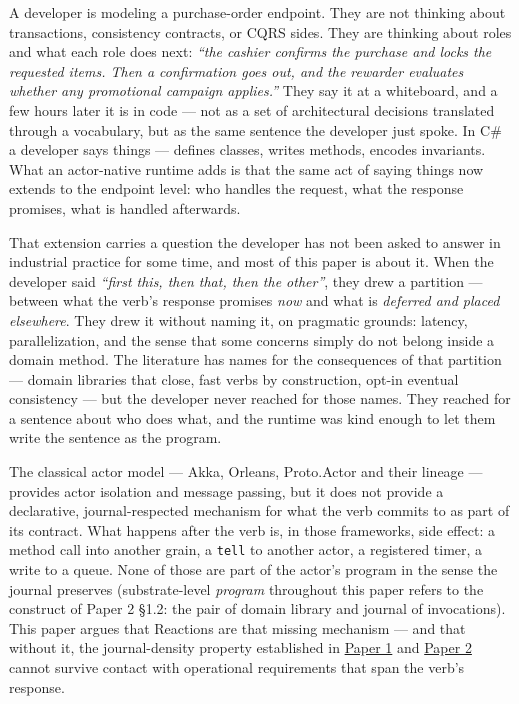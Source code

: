 \documentclass[
]{article}
\let\origtexttt\texttt%
\renewcommand{\texttt}[1]{\origtexttt{\seqsplit{#1}}}%
\let\texttt\origtexttt%
\begin{document}
A developer is modeling a purchase-order endpoint. They are not thinking
about transactions, consistency contracts, or CQRS sides. They are
thinking about roles and what each role does next: \emph{``the cashier
confirms the purchase and locks the requested items. Then a confirmation
goes out, and the rewarder evaluates whether any promotional campaign
applies.''} They say it at a whiteboard, and a few hours later it is in
code --- not as a set of architectural decisions translated through a
vocabulary, but as the same sentence the developer just spoke. In C\# a
developer says things --- defines classes, writes methods, encodes
invariants. What an actor-native runtime adds is that the same act of
saying things now extends to the endpoint level: who handles the
request, what the response promises, what is handled afterwards.

That extension carries a question the developer has not been asked to
answer in industrial practice for some time, and most of this paper is
about it. When the developer said \emph{``first this, then that, then
the other''}, they drew a partition --- between what the verb's response
promises \emph{now} and what is \emph{deferred and placed elsewhere}.
They drew it without naming it, on pragmatic grounds: latency,
parallelization, and the sense that some concerns simply do not belong
inside a domain method. The literature has names for the consequences of
that partition --- domain libraries that close, fast verbs by
construction, opt-in eventual consistency --- but the developer never
reached for those names. They reached for a sentence about who does
what, and the runtime was kind enough to let them write the sentence as
the program.

The classical actor model --- Akka, Orleans, Proto.Actor and their
lineage --- provides actor isolation and message passing, but it does
not provide a declarative, journal-respected mechanism for what the verb
commits to as part of its contract. What happens after the verb is, in
those frameworks, side effect: a method call into another grain, a
\texttt{tell} to another actor, a registered timer, a write to a queue.
None of those are part of the actor's program in the sense the journal
preserves (substrate-level \emph{program} throughout this paper refers
to the construct of Paper 2 §1.2: the pair of domain library and journal
of invocations). This paper argues that Reactions are that missing
mechanism --- and that without it, the journal-density property
established in \href{01-anti-porosity.md}{Paper 1} and
\href{02-program-value-separability.md}{Paper 2} cannot survive contact
with operational requirements that span the verb's response.
\end{document}
